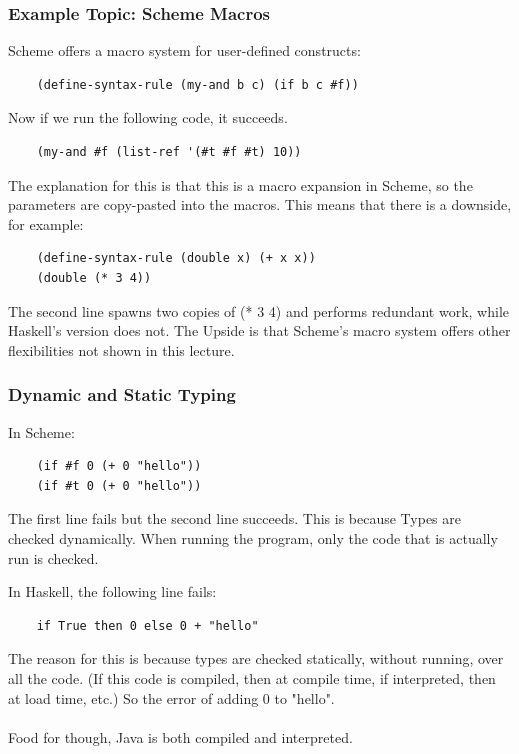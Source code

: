 \documentclass[12pt]{article}
\begin{document}
\subsubsection{Example Topic: Scheme Macros}

Scheme offers a macro system for user-defined constructs:

\begin{lstlisting}
    (define-syntax-rule (my-and b c) (if b c #f))
\end{lstlisting}

Now if we run the following code, it succeeds.

\begin{lstlisting}
    (my-and #f (list-ref '(#t #f #t) 10))
\end{lstlisting}

The explanation for this is that this is a macro expansion in Scheme, so the parameters are copy-pasted into the macros. This means that there is a downside, for example:

\begin{lstlisting}
    (define-syntax-rule (double x) (+ x x))
    (double (* 3 4))
\end{lstlisting}

The second line spawns two copies of (* 3 4) and performs redundant work, while Haskell's version does not. The Upside is that Scheme's macro system offers other flexibilities not shown in this lecture.

\subsubsection{Dynamic and Static Typing}

In Scheme:
\begin{lstlisting}
    (if #f 0 (+ 0 "hello"))
    (if #t 0 (+ 0 "hello"))
\end{lstlisting}

The first line fails but the second line succeeds. This is because Types are checked dynamically. When running the program, only the code that is actually run is checked.

In Haskell, the following line fails:
\begin{lstlisting}
    if True then 0 else 0 + "hello"
\end{lstlisting}

The reason for this is because types are checked statically, without running, over all the code. (If this code is compiled, then at compile time, if interpreted, then at load time, etc.) So the error of adding 0 to "hello".\\
\\
Food for though, Java is both compiled and interpreted.
\end{document}
